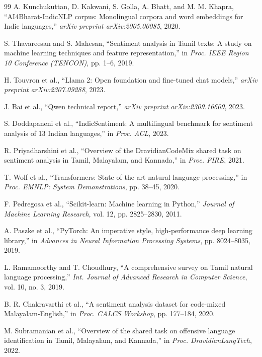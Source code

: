 \documentclass[conference]{IEEEtran}
\begin{document}
\begin{thebibliography}{99}
A. Kunchukuttan, D. Kakwani, S. Golla, A. Bhatt, and M. M. Khapra, ``AI4Bharat-IndicNLP corpus: Monolingual corpora and word embeddings for Indic languages,'' \textit{arXiv preprint arXiv:2005.00085}, 2020.

S. Thavareesan and S. Mahesan, ``Sentiment analysis in Tamil texts: A study on machine learning techniques and feature representation,'' in \textit{Proc. IEEE Region 10 Conference (TENCON)}, pp. 1--6, 2019.

H. Touvron et al., ``Llama 2: Open foundation and fine-tuned chat models,'' \textit{arXiv preprint arXiv:2307.09288}, 2023.

J. Bai et al., ``Qwen technical report,'' \textit{arXiv preprint arXiv:2309.16609}, 2023.

S. Doddapaneni et al., ``IndicSentiment: A multilingual benchmark for sentiment analysis of 13 Indian languages,'' in \textit{Proc. ACL}, 2023.

R. Priyadharshini et al., ``Overview of the DravidianCodeMix shared task on sentiment analysis in Tamil, Malayalam, and Kannada,'' in \textit{Proc. FIRE}, 2021.

T. Wolf et al., ``Transformers: State-of-the-art natural language processing,'' in \textit{Proc. EMNLP: System Demonstrations}, pp. 38--45, 2020.

F. Pedregosa et al., ``Scikit-learn: Machine learning in Python,'' \textit{Journal of Machine Learning Research}, vol. 12, pp. 2825--2830, 2011.

A. Paszke et al., ``PyTorch: An imperative style, high-performance deep learning library,'' in \textit{Advances in Neural Information Processing Systems}, pp. 8024--8035, 2019.

L. Ramamoorthy and T. Choudhury, ``A comprehensive survey on Tamil natural language processing,'' \textit{Int. Journal of Advanced Research in Computer Science}, vol. 10, no. 3, 2019.

B. R. Chakravarthi et al., ``A sentiment analysis dataset for code-mixed Malayalam-English,'' in \textit{Proc. CALCS Workshop}, pp. 177--184, 2020.

M. Subramanian et al., ``Overview of the shared task on offensive language identification in Tamil, Malayalam, and Kannada,'' in \textit{Proc. DravidianLangTech}, 2022.


\end{thebibliography}
\end{document}
